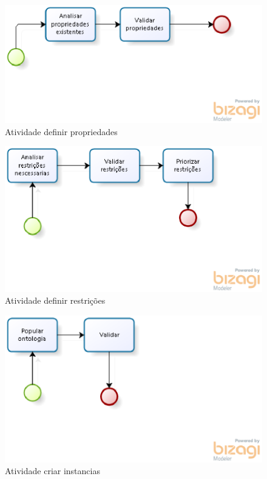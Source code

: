 \begin{figure}[H]
  \centering
    \includegraphics[keepaspectratio=true,scale=0.5]{figuras/Definir_propriedades.eps}
  \caption{Atividade definir propriedades}
\end{figure}

\begin{figure}[H]
  \centering
    \includegraphics[keepaspectratio=true,scale=0.5]{figuras/Definir_restricoes.eps}
  \caption{Atividade definir restrições}
\end{figure}

\begin{figure}[H]
  \centering
    \includegraphics[keepaspectratio=true,scale=0.5]{figuras/Criar_instancias.eps}
  \caption{Atividade criar instancias}
\end{figure}

